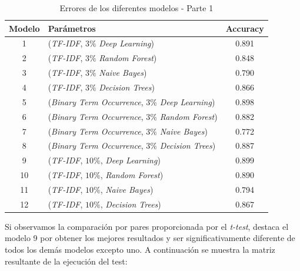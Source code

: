 \documentclass[es]{uc3mreport}
\begin{document}
\begin{report}
    \begin{table}[H]
        \begin{center}
            \begin{tabular}{ @{}clc@{} }
                \toprule
                Modelo & Parámetros\footnotemark[1] & Accuracy\\
                \midrule
                1  & (\textit{TF-IDF}, $3\%$                 \textit{Deep Learning})  & 0.891\\
                2  & (\textit{TF-IDF}, $3\%$                 \textit{Random Forest})  & 0.848\\
                3  & (\textit{TF-IDF}, $3\%$                 \textit{Naive Bayes})    & 0.790\\
                4  & (\textit{TF-IDF}, $3\%$                 \textit{Decision Trees}) & 0.866\\
                5  & (\textit{Binary Term Occurrence}, $3\%$ \textit{Deep Learning})  & 0.898\\
                6  & (\textit{Binary Term Occurrence}, $3\%$ \textit{Random Forest})  & 0.882\\
                7  & (\textit{Binary Term Occurrence}, $3\%$ \textit{Naive Bayes})    & 0.772\\
                8  & (\textit{Binary Term Occurrence}, $3\%$ \textit{Decision Trees}) & 0.887\\
                9  & (\textit{TF-IDF}, $10\%$,               \textit{Deep Learning})  & 0.899\\
                10 & (\textit{TF-IDF}, $10\%$,               \textit{Random Forest})  & 0.890\\
                11 & (\textit{TF-IDF}, $10\%$,               \textit{Naive Bayes})    & 0.794\\
                12 & (\textit{TF-IDF}, $10\%$,               \textit{Decision Trees}) & 0.867\\
                \bottomrule
            \end{tabular}
            \caption{Errores de los diferentes modelos - Parte 1}
        \end{center}
    \end{table}

    Si observamos la comparación por pares proporcionada por el \textit{t-test},
    destaca el modelo 9 por obtener los mejores resultados y ser significativamente
    diferente de todos los demás modelos excepto uno. A continuación se muestra
    la matriz resultante de la ejecución del test:


\end{report}
\end{document}
